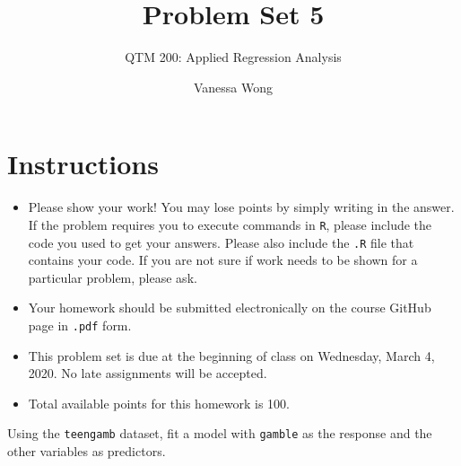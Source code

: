 \documentclass[12pt,letterpaper]{article}
\title{Problem Set 5}
\date{Vanessa Wong}
\author{QTM 200: Applied Regression Analysis}
\begin{document}
	\maketitle
	
	\section*{Instructions}
	\begin{itemize}
		\item Please show your work! You may lose points by simply writing in the answer. If the problem requires you to execute commands in \texttt{R}, please include the code you used to get your answers. Please also include the \texttt{.R} file that contains your code. If you are not sure if work needs to be shown for a particular problem, please ask.
		\item Your homework should be submitted electronically on the course GitHub page in \texttt{.pdf} form.
		\item This problem set is due at the beginning of class on Wednesday, March 4, 2020. No late assignments will be accepted.
		\item Total available points for this homework is 100.
	\end{itemize}
	
		\vspace{.5cm}
	
\noindent  Using the \texttt{teengamb} dataset, fit a model with \texttt{gamble} as the response and the other variables as predictors. 
\end{document}
